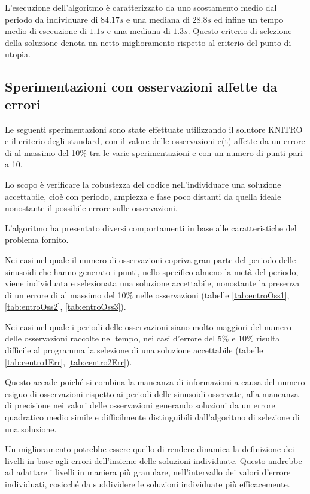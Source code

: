 \documentclass[a4paper,12pt]{report}
\begin{document}
L'esecuzione dell'algoritmo è caratterizzato da uno scostamento medio dal periodo da individuare di $84.17s$ e una mediana di $28.8s$ ed infine un tempo medio di esecuzione di $1.1s$ e una mediana di $1.3s$.
Questo criterio di selezione della soluzione denota un netto miglioramento rispetto al criterio del punto di utopia.

\subsection{Sperimentazioni con osservazioni affette da errori}
Le seguenti sperimentazioni sono state effettuate utilizzando il solutore KNITRO e il criterio degli standard, con il valore delle osservazioni e(t) affette da un errore di al massimo del 10\% tra le varie sperimentazioni e con un numero di punti pari a 10.

Lo scopo è verificare la robustezza del codice nell'individuare una soluzione accettabile, cioè con periodo, ampiezza e fase poco distanti da quella ideale nonostante il possibile errore sulle osservazioni.

L'algoritmo ha presentato diversi comportamenti in base alle caratteristiche del problema fornito.

Nei casi nel quale il numero di osservazioni copriva gran parte del periodo delle sinusoidi che hanno generato i punti, nello specifico almeno la metà del periodo, viene individuata e selezionata una soluzione accettabile, nonostante la presenza di un errore di al massimo del 10\% nelle osservazioni (tabelle \ref{tab:entroOss1}, \ref{tab:entroOss2}, \ref{tab:entroOss3}).

Nei casi nel quale i periodi delle osservazioni siano molto maggiori del numero delle osservazioni raccolte nel tempo, nei casi d'errore del 5\% e 10\% risulta difficile al programma la selezione di una soluzione accettabile
(tabelle \ref{tab:centro1Err}, \ref{tab:centro2Err}).

Questo accade poiché si combina la mancanza di informazioni a causa del numero esiguo di osservazioni rispetto ai periodi delle sinusoidi osservate, alla mancanza di precisione nei valori delle osservazioni generando soluzioni da un errore quadratico medio simile e difficilmente distinguibili dall'algoritmo di selezione di una soluzione.

Un miglioramento potrebbe essere quello di rendere dinamica la definizione dei livelli in base agli errori dell'insieme delle soluzioni individuate. Questo andrebbe ad adattare i livelli in maniera più granulare, nell'intervallo dei valori d'errore individuati, cosicché da suddividere le soluzioni individuate più efficacemente.
\end{document}
